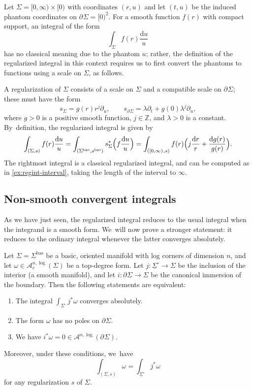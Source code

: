 \documentclass[JEP,XML,SOM,Unicode,NoFloatCountersInSection,published]{cedram}
\let\oldbullet\bullet
\renewcommand{\bullet}{{\raisebox{1pt}{$\scriptscriptstyle\oldbullet$}}}
\newcommand{\rBrac}[1]{\Bigl(#1\Bigr)}
\theoremstyle{definition}
\theoremstyle{remark}
\newenvironment{example}
  {\pushQED{\qed}\renewcommand{\qedsymbol}{$\lozenge$}\examplex}
  {\popQED\endexamplex}
\newcommand{\ZZ}{\mathbb{Z}}
\newcommand{\model}[2]{\halfspc{#1}\times[0)^{#2}}
\newcommand{\halfspc}[1]{[0,\infty)^{#1}}
\newcommand{\dd}{\mathrm{d}}
\newcommand{\dlog}[1]{\frac{\dd#1}{#1}}
\newcommand{\Alog}[2][\bullet]{\mathscr{A}^{#1,\log}(#2)}
\newcommand{\Alogc}[2][\bullet]{\mathscr{A}^{#1,\log}_c(#2)}
\newcommand{\cvf}[1]{\partial_{#1}}
\newcommand{\Sig}{\Sigma}
\newcommand{\uSigo}{\underline{\Sigma}^\circ}
\newcommand{\bas}[1]{{#1}^{\mathrm{bas}}}
\newcommand{\Sigbas}{\bas{\Sig}}
\newcommand{\bdSig}[1][]{\partial^{#1}\Sigma}
\begin{document}
\begin{example}
Let $\Sig = \model{}{}$ with coordinates $(r,u)$ and let $(t,u)$ be the induced phantom coordinates on $\bdSig = [0)^2$. For a smooth function $f(r)$ with compact support, an integral of the form
\[
\int_{\Sig} f(r)\dlog{u}
\]
has no classical meaning due to the phantom $u$; rather, the definition of the regularized integral in this context requires us to first convert the phantoms to functions using a scale on $\Sig$, as follows.

A regularization of $\Sig$ consists of a scale on $\Sig$ and a compatible scale on $\bdSig$; these must have the form
\[
s_\Sig = g(r) r^j \cvf{u}, \qquad s_{\bdSig} = \lambda \cvf{t} + g(0)\lambda^j \cvf{u},
\]
where $g > 0$ is a positive smooth function, $j \in \ZZ$, and $\lambda > 0$ is a constant. By~definition, the regularized integral is given by
\[
\int_{(\Sig,s)}f(r)\dlog{u} = \int_{(\Sigbas,\bas{s})} s_\Sig^*\rBrac{f\dlog{u}} = \int_{(\halfspc{},s)} f(r) \rBrac{j \dlog{r} + \dlog{g(r)}}.
\]
The rightmost integral is a classical regularized integral, and can be computed as in \autoref{ex:regint-interval}, taking the length of the interval to $\infty$.
\end{example}

\subsection{Non-smooth convergent integrals}

As we have just seen, the regularized integral reduces to the usual integral when the integrand is a smooth form. We~will now prove a stronger statement: it reduces to the ordinary integral whenever the latter converges absolutely.

\begin{proposition}\label{prop:convergent-integrals}
Let $\Sig = \Sigbas$ be a basic, oriented manifold with log corners of dimension $n$, and let $\omega \in \Alogc[n]{\Sig}$ be a top-degree form. Let $j \colon \uSigo \to \Sig$ be the inclusion of the interior (a smooth manifold), and let $i \colon \bdSig \to \Sig$ be the canonical immersion of the boundary.
Then the following statements are equivalent:
\begin{enumerate}
\item\label{prop:convergent-integrals1}
The integral $\int_{\uSigo} j^*\omega$ converges absolutely.
\item\label{prop:convergent-integrals2}
The form $\omega$ has no poles on $\bdSig$.
\item\label{prop:convergent-integrals3}
We have $i^*\omega = 0 \in \Alog[n]{\bdSig}$.
\end{enumerate}
Moreover, under these conditions, we~have
\[
\int_{(\Sig,s)}\omega = \int_{\uSigo} j^*\omega
\]
for any regularization $s$ of $\Sig$.
\end{proposition}
\end{document}
